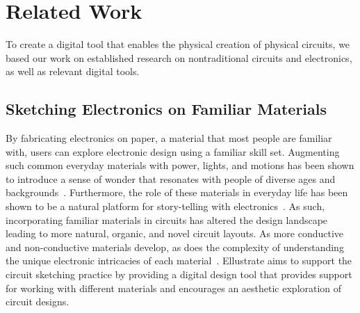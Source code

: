 \documentclass{sigchi}
\begin{document}
\section{Related Work}
To create a digital tool that enables the physical creation of physical circuits, we based our work on established research on nontraditional circuits and electronics, as well as relevant digital tools. 

\subsection{Sketching Electronics on Familiar Materials}
By fabricating electronics on paper, a material that most people are familiar with, users can explore electronic design using a familiar skill set.  Augmenting such common everyday materials with power, lights, and motions has been shown to introduce a sense of wonder that resonates with people of diverse ages and backgrounds~\cite{karagozler_paper_2013,Qi:2010tp,qi_stickers_2015,qi_sketching_2014}. Furthermore, the role of these materials in everyday life has been shown to be a natural platform for story-telling with electronics~\cite{Jacoby:2013cq}. As such, incorporating familiar materials in circuits has altered the design landscape leading to more natural, organic, and novel circuit layouts.
As more conductive and non-conductive materials develop, as does the complexity of understanding the unique electronic intricacies of each material~\cite{Hodges:2014cm}.  Ellustrate aims to support the circuit sketching practice by providing a digital design tool that provides support for working with different materials and encourages an aesthetic exploration of circuit designs.

\end{document}
